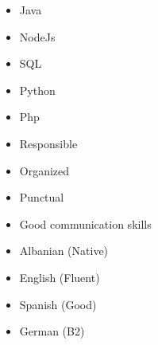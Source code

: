 
\threecolumnsection
{
\vspace{0.1em}
\begin{itemize}
\item Java
\item NodeJs
\item SQL
\item Python
\item Php
\end{itemize}
}
{
\begin{itemize}
	\item Responsible
\item Organized
\item Punctual
\item Good communication skills
\end{itemize}
}
{
\vspace{0.1em}
\begin{itemize}
\item Albanian (Native)
\item English (Fluent)
\item Spanish (Good)
\item German (B2)
\end{itemize}
}

  \emptySeparator
